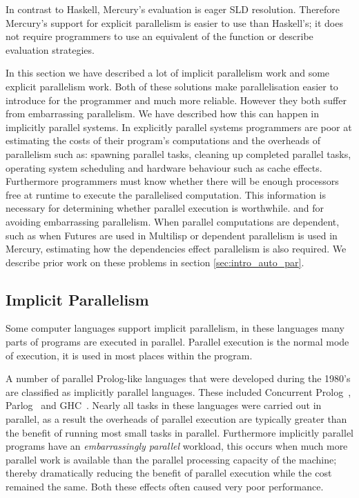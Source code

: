 In contrast to Haskell,
Mercury's evaluation is eager SLD resolution.
Therefore Mercury's support for explicit parallelism is easier to use
than Haskell's;
it does not require programmers to use an equivalent of
the  function or describe evaluation strategies.

In this section we have described a lot of implicit parallelism work
and some explicit parallelism work.
Both of these solutions make parallelisation easier to introduce for the
programmer and much more reliable.
However they both suffer from embarrassing parallelism.
We have described how this can happen in implicitly parallel systems.
In explicitly parallel systems programmers are poor at estimating the
costs of their program's computations and
the overheads of parallelism such as:
spawning parallel tasks,
cleaning up completed parallel tasks,
operating system scheduling and
hardware behaviour such as cache effects.
Furthermore programmers must know whether there will be enough
processors free at runtime to execute the parallelised computation.
This information is necessary for determining whether parallel execution
is worthwhile.
and for avoiding embarrassing parallelism.
When parallel computations are dependent,
such as when Futures are used in Multilisp or
dependent parallelism is used in Mercury,
estimating how the dependencies effect parallelism is also required.
We describe prior work on these problems in section
\ref{sec:intro_auto_par}.


\subsection{Implicit Parallelism}
\label{sec:intro_implicit_par}

Some computer languages support implicit parallelism,
in these languages many parts of programs are executed in parallel.
Parallel execution is the normal mode of execution,
it is used in most places within the program.

A number of parallel Prolog-like languages that were developed during the
1980's are classified as implicitly parallel languages.
These included Concurrent
Prolog~\citep{saraswat85:probl_with_concur_prolog,saraswat86:concurrent_prolog_definition,shapiro:flat_concur_prolog},
Parlog~\citep{clark:84:parlog_sys_prog,clark:86:parlog} and GHC~\citep{ueda:ghc}.
Nearly all tasks in these languages were carried out in
parallel,
as a result the overheads of parallel execution are typically
greater than the benefit of running most small tasks in parallel.
Furthermore implicitly parallel programs have an \emph{embarrassingly
  parallel} workload,
this occurs when much more parallel work is available than the parallel
processing capacity of the machine;
thereby dramatically reducing the benefit of parallel execution while
the cost remained the same.
Both these effects often caused very poor performance.

